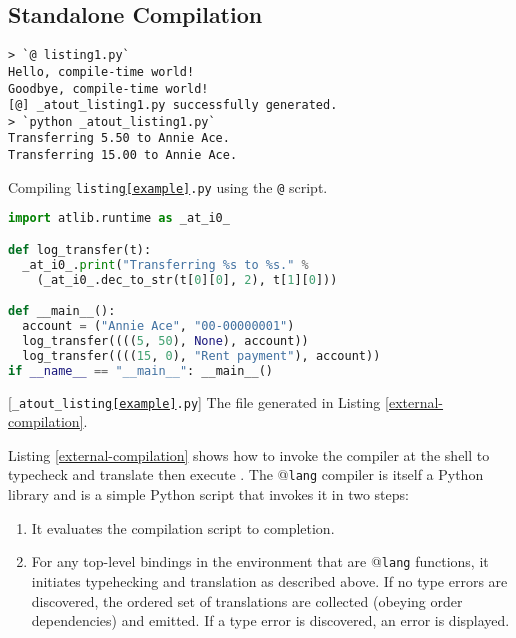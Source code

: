 \subsection{Standalone Compilation}\label{compilation} 
\begin{codelisting}[t]
\begin{lstlisting}[style=Bash]
> `@ listing1.py`
Hello, compile-time world!
Goodbye, compile-time world!
[@] _atout_listing1.py successfully generated.
> `python _atout_listing1.py`
Transferring 5.50 to Annie Ace.
Transferring 15.00 to Annie Ace.
\end{lstlisting}
\caption{Compiling \texttt{listing\ref{example}.py} using the \texttt{@} script.}
\label{external-compilation}
\end{codelisting}
\begin{codelisting}[t]
\begin{lstlisting}[language=Python]
import atlib.runtime as _at_i0_

def log_transfer(t):
  _at_i0_.print("Transferring %s to %s." % 
    (_at_i0_.dec_to_str(t[0][0], 2), t[1][0]))

def __main__():
  account = ("Annie Ace", "00-00000001")
  log_transfer((((5, 50), None), account))
  log_transfer((((15, 0), "Rent payment"), account))
if __name__ == "__main__": __main__()
\end{lstlisting}
\caption{[\texttt{\_atout\_listing\ref{example}.py}] The file generated in Listing \ref{external-compilation}.}
\label{example-out}
\end{codelisting}


Listing \ref{external-compilation} shows how to invoke the  compiler at the shell to typecheck and translate then execute . %
The @\texttt{lang} compiler is itself a Python library and  is a simple Python script that invokes it in two steps:
\begin{enumerate}
\item It evaluates the compilation script to completion.
\item For any top-level bindings in the environment that are @\texttt{lang} functions, it initiates typehecking and translation as described above. If no type errors are discovered, the ordered set of translations are collected (obeying order dependencies) and emitted. If a type error is discovered, an error is displayed.
\end{enumerate}

